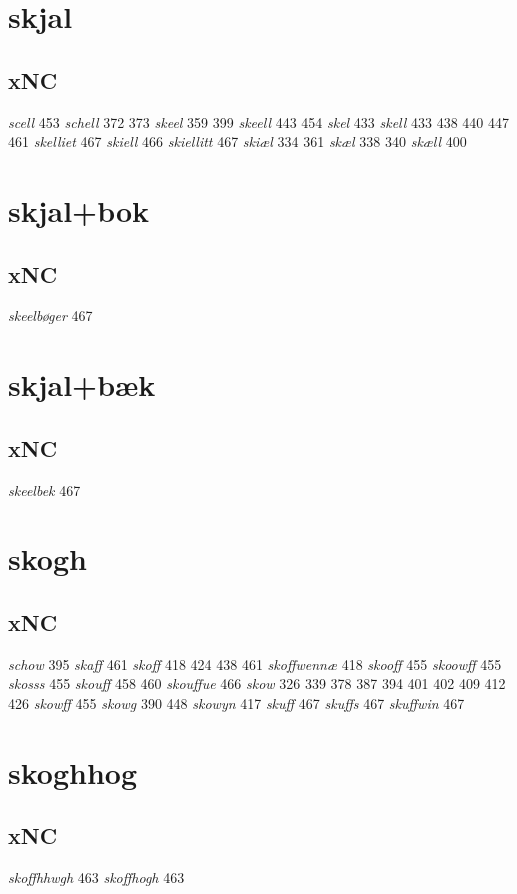 \documentclass[a4paper,twocolumn]{article}
\begin{document}
\section{skjal}
\label{sec:org4d30120}
\subsection{xNC}
\label{sec:org7ba3ec8}
\emph{scell} 453 \emph{schell} 372 373 \emph{skeel} 359 399 \emph{skeell} 443 454 \emph{skel} 433 \emph{skell} 433 438 440 447 461 \emph{skelliet} 467 \emph{skiell} 466 \emph{skiellitt} 467 \emph{skiæl} 334 361 \emph{skæl} 338 340 \emph{skæll} 400 
\section{skjal+bok}
\label{sec:org4050a88}
\subsection{xNC}
\label{sec:org94b0526}
\emph{skeelbøger} 467 
\section{skjal+bæk}
\label{sec:orgbc9790a}
\subsection{xNC}
\label{sec:org70eae24}
\emph{skeelbek} 467 
\section{skogh}
\label{sec:org0608f3f}
\subsection{xNC}
\label{sec:org6af89f1}
\emph{schow} 395 \emph{skaff} 461 \emph{skoff} 418 424 438 461 \emph{skoffwennæ} 418 \emph{skooff} 455 \emph{skoowff} 455 \emph{skosss} 455 \emph{skouff} 458 460 \emph{skouffue} 466 \emph{skow} 326 339 378 387 394 401 402 409 412 426 \emph{skowff} 455 \emph{skowg} 390 448 \emph{skowyn} 417 \emph{skuff} 467 \emph{skuffs} 467 \emph{skuffwin} 467 
\section{skoghhog}
\label{sec:org459e34a}
\subsection{xNC}
\label{sec:org563a0f5}
\emph{skoffhhwgh} 463 \emph{skoffhogh} 463 
\end{document}

